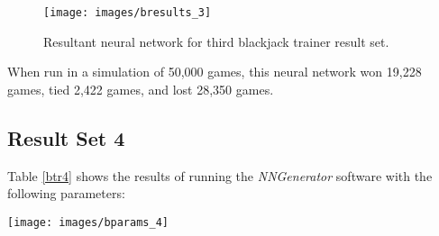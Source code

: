 \begin{figure}[h!]
  \centering
  \texttt{[image: images/bresults\_3]}
  \caption{Resultant neural network for third blackjack trainer result set.}
  \label{bresults_3}
\end{figure}

When run in a simulation of 50,000 games, this neural network won 19,228
games, tied 2,422 games, and lost 28,350 games.

\subsection{Result Set 4}
Table \ref{btr4} shows the results of running the {\it NNGenerator} software with the following parameters:

\begin{center}
\texttt{[image: images/bparams\_4]}
\end{center}

